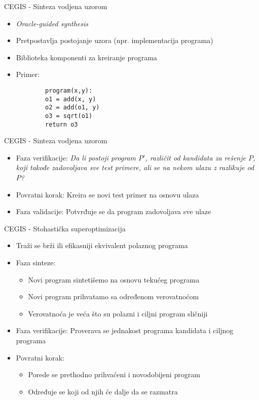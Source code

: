 
\begin{frame}[fragile]{CEGIS - Sinteza vodjena uzorom}
    \begin{itemize}
        \item \emph{Oracle-guided synthesis}
        \item Pretpostavlja postojanje uzora (npr. implementacija programa)
        \item Biblioteka komponenti za kreiranje programa
		\item Primer:\\
		\centering
        \begin{lstlisting}
	    program(x,y): 
		o1 = add(x, y)
		o2 = add(o1, y) 
		o3 = sqrt(o1) 
		return o3
        \end{lstlisting}
    \end{itemize}
\end{frame}


\begin{frame}{CEGIS - Sinteza vodjena uzorom}
    \begin{itemize}     
        \item Faza verifikacije: \emph{Da li postoji program $P'$, različit od kandidata za rešenje $P$, koji takođe zadovoljava sve test primere, ali se na nekom ulazu z razlikuje od $P$?} 
        \item Povratni korak: Kreira se novi test primer na osnovu ulaza
        \item Faza validacije: Potvrđuje se da program zadovoljava sve ulaze
    \end{itemize}
\end{frame}


\begin{frame}{CEGIS - Stohastička superoptimizacija}
    \begin{itemize}
        \item Traži se brži ili efikasniji ekvivalent polaznog programa
        \item Faza sinteze:
        \begin{itemize}
        	\item Novi program sintetišemo na osnovu tekućeg programa
        	\item Novi program prihvatamo sa određenom verovatnoćom
        	\item Verovatnoća je veća što su polazni i ciljni program sličniji
        \end{itemize}
        \item Faza verifikacije: Proverava se jednakost programa kandidata i ciljnog programa
        \item Povratni korak: 
        \begin{itemize}
        	\item Porede se prethodno prihvaćeni i novodobijeni program
        	\item Određuje se koji od njih \'c{}e dalje da se razmatra
        \end{itemize}
    \end{itemize}
\end{frame}

